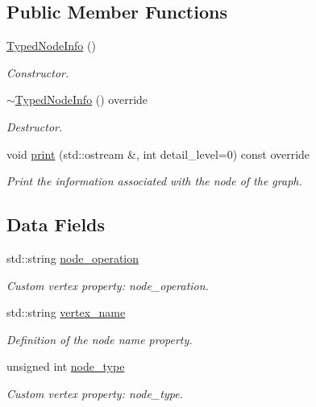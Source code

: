 \subsection*{Public Member Functions}
\begin{DoxyCompactItemize}
\item 
\hyperlink{structTypedNodeInfo_a274ac58a99402be306cd888541f935c8}{Typed\+Node\+Info} ()
\begin{DoxyCompactList}\small\item\em Constructor. \end{DoxyCompactList}\item 
\hyperlink{structTypedNodeInfo_ac49f2aecdc6d3c537ecd887ed75b7de0}{$\sim$\+Typed\+Node\+Info} () override
\begin{DoxyCompactList}\small\item\em Destructor. \end{DoxyCompactList}\item 
void \hyperlink{structTypedNodeInfo_ad2e8b00442b9215ece3d7b2cf2495aef}{print} (std\+::ostream \&, int detail\+\_\+level=0) const override
\begin{DoxyCompactList}\small\item\em Print the information associated with the node of the graph. \end{DoxyCompactList}\end{DoxyCompactItemize}
\subsection*{Data Fields}
\begin{DoxyCompactItemize}
\item 
std\+::string \hyperlink{structTypedNodeInfo_a92bbce6cb643c1a0b507dc189b9030b4}{node\+\_\+operation}
\begin{DoxyCompactList}\small\item\em Custom vertex property\+: node\+\_\+operation. \end{DoxyCompactList}\item 
std\+::string \hyperlink{structTypedNodeInfo_a19d4dd6419b9bc65a818ab0bf00565f4}{vertex\+\_\+name}
\begin{DoxyCompactList}\small\item\em Definition of the node name property. \end{DoxyCompactList}\item 
unsigned int \hyperlink{structTypedNodeInfo_affdcb12b1e38b9bec3126cfc9c16a653}{node\+\_\+type}
\begin{DoxyCompactList}\small\item\em Custom vertex property\+: node\+\_\+type. \end{DoxyCompactList}\end{DoxyCompactItemize}
